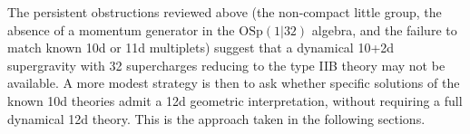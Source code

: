 The persistent obstructions reviewed above (the non-compact little group, the absence of a momentum generator in the $\mathrm{OSp}(1|32)$ algebra, and the failure to match known 10d or 11d multiplets) suggest that a dynamical 10+2d supergravity with 32 supercharges reducing to the type IIB theory may not be available.
A more modest strategy is then to ask whether specific solutions of the known 10d theories admit a 12d geometric interpretation, without requiring a full dynamical 12d theory.
This is the approach taken in the following sections.
